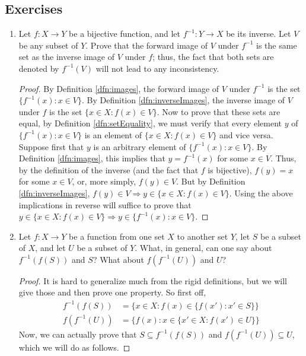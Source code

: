 \documentclass[../main.tex]{subfiles}
\begin{document}
\subsection*{Exercises}
\begin{enumerate}[ref={\thesection.\arabic*}]
    \item \label{exr:3.4.1}Let $f:X\to Y$ be a bijective function, and let $f^{-1}:Y\to X$ be its inverse. Let $V$ be any subset of $Y$. Prove that the forward image of $V$ under $f^{-1}$ is the same set as the inverse image of $V$ under $f$; thus, the fact that both sets are denoted by $f^{-1}(V)$ will not lead to any inconsistency.
    \begin{proof}
        By Definition \ref{dfn:images}, the forward image of $V$ under $f^{-1}$ is the set $\{f^{-1}(x):x\in V\}$. By Definition \ref{dfn:inverseImages}, the inverse image of $V$ under $f$ is the set $\{x\in X:f(x)\in V\}$. Now to prove that these sets are equal, by Definition \ref{dfn:setEquality}, we must verify that every element $y$ of $\{f^{-1}(x):x\in V\}$ is an element of $\{x\in X:f(x)\in V\}$ and vice versa. Suppose first that $y$ is an arbitrary element of $\{f^{-1}(x):x\in V\}$. By Definition \ref{dfn:images}, this implies that $y=f^{-1}(x)$ for some $x\in V$. Thus, by the definition of the inverse (and the fact that $f$ is bijective), $f(y)=x$ for some $x\in V$, or, more simply, $f(y)\in V$. But by Definition \ref{dfn:inverseImages}, $f(y)\in V \Longrightarrow y\in\{x\in X:f(x)\in V\}$. Using the above implications in reverse will suffice to prove that $y\in\{x\in X:f(x)\in V\} \Longrightarrow y\in\{f^{-1}(x):x\in V\}$.
    \end{proof}
    \item \label{exr:3.4.2}Let $f:X\to Y$ be a function from one set $X$ to another set $Y$, let $S$ be a subset of $X$, and let $U$ be a subset of $Y$. What, in general, can one say about $f^{-1}(f(S))$ and $S$? What about $f(f^{-1}(U))$ and $U$?
    \begin{proof}
        It is hard to generalize much from the rigid definitions, but we will give those and then prove one property. So first off,
        \begin{align*}
            f^{-1}(f(S)) &= \{x\in X:f(x)\in\{f(x'):x'\in S\}\}\\
            f(f^{-1}(U)) &= \{f(x):x\in\{x'\in X:f(x')\in U\}\}
        \end{align*}
        Now, we can actually prove that $S\subseteq f^{-1}(f(S))$ and $f(f^{-1}(U))\subseteq U$, which we will do as follows.\par

\end{proof}
\end{enumerate}
\end{document}
